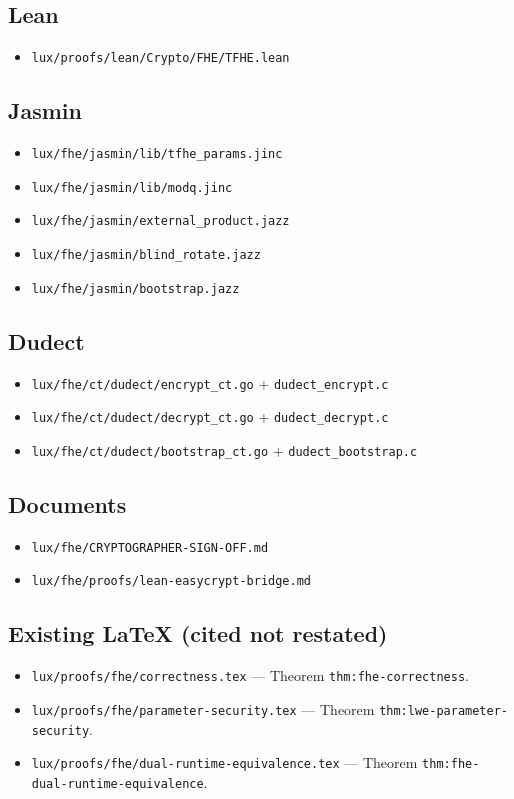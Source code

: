 \documentclass[11pt,a4paper]{article}
\begin{document}
\subsection*{Lean}
\begin{itemize}
\item \texttt{lux/proofs/lean/Crypto/FHE/TFHE.lean}
\end{itemize}

\subsection*{Jasmin}
\begin{itemize}
\item \texttt{lux/fhe/jasmin/lib/tfhe\_params.jinc}
\item \texttt{lux/fhe/jasmin/lib/modq.jinc}
\item \texttt{lux/fhe/jasmin/external\_product.jazz}
\item \texttt{lux/fhe/jasmin/blind\_rotate.jazz}
\item \texttt{lux/fhe/jasmin/bootstrap.jazz}
\end{itemize}

\subsection*{Dudect}
\begin{itemize}
\item \texttt{lux/fhe/ct/dudect/encrypt\_ct.go} +
  \texttt{dudect\_encrypt.c}
\item \texttt{lux/fhe/ct/dudect/decrypt\_ct.go} +
  \texttt{dudect\_decrypt.c}
\item \texttt{lux/fhe/ct/dudect/bootstrap\_ct.go} +
  \texttt{dudect\_bootstrap.c}
\end{itemize}

\subsection*{Documents}
\begin{itemize}
\item \texttt{lux/fhe/CRYPTOGRAPHER-SIGN-OFF.md}
\item \texttt{lux/fhe/proofs/lean-easycrypt-bridge.md}
\end{itemize}

\subsection*{Existing LaTeX (cited not restated)}
\begin{itemize}
\item \texttt{lux/proofs/fhe/correctness.tex}
  --- Theorem \texttt{thm:fhe-correctness}.
\item \texttt{lux/proofs/fhe/parameter-security.tex}
  --- Theorem \texttt{thm:lwe-parameter-security}.
\item \texttt{lux/proofs/fhe/dual-runtime-equivalence.tex}
  --- Theorem \texttt{thm:fhe-dual-runtime-equivalence}.
\end{itemize}
\end{document}
